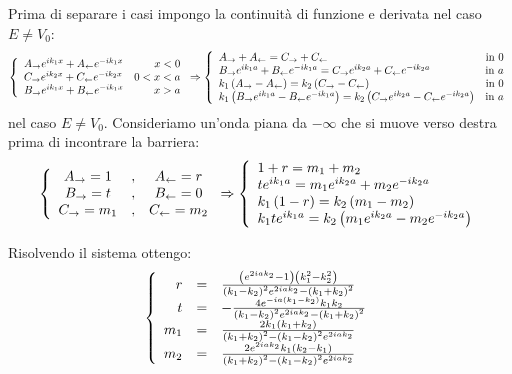 Prima di separare i casi impongo la continuit\`a di funzione e derivata nel caso  $E \neq V_0$:
\begin{equation}\label{eq:continuita}
\lr\{.{\begin{array}{lr}
	A_\to e^{ik_1x} + A_\from e^{-ik_1x}	&	x<0\\
	C_\to e^{ik_2x} + C_\from e^{-ik_2x}	&	0<x<a\\
	B_\to e^{ik_1x} + B_\from e^{-ik_1x}	&	x>a
	\end{array}}\Rightarrow\lr\{.{\begin{array}{lr}
	A_\to  +A_\from = C_\to+C_\from															&	\text{in }0\\
	B_\to e^{ik_1a} +B_\from e^{-ik_1a} = C_\to e^{ik_2a}+C_\from e^{-ik_2a}				&	\text{in }a\\
	k_1\lrt{A_\to-A_\from}=k_2\lrt{C_\to-C_\from }	&	\text{in }0\\
	k_1\lrt{B_\to e^{ik_1a}-B_\from e^{-ik_1a}} = k_2\lrt{C_\to e^{ik_2a}-C_\from e^{-ik_2a}}	&	\text{in }a
	\end{array}}
\end{equation}
nel caso $E \neq V_0$. Consideriamo un'onda piana da $-\infty$ che si muove verso destra prima di incontrare la barriera:
\begin{equation}
\lr\{.{\begin{array}{ccc}
	A_\to = 1&,&
	A_\from = r\\
	B_\to = t&,&
	B_\from=0\\
	C_\to = m_1&,&
	C_\from=m_2
	\end{array}} \Rightarrow\lr\{.{\begin{array}{l}
	1+r= m_1 +m_2 \\
	t e^{ik_1a} = m_1 e^{ik_2a}+m_2 e^{-ik_2a}\\
	k_1\lrt{1 - r}=k_2\lrt{m_1 - m_2}\\
	k_1 t e^{ik_1a} = k_2\lrt{m_1 e^{ik_2a}-m_2 e^{-ik_2a}}
	\end{array}}
\end{equation}

Risolvendo il sistema ottengo:
\begin{equation}
\lr\{.{\begin{array}{rcl}
	r	&=& \frac{\lrt{e^{2 i a k_2}-1}\lrt{k_1^2-k_2^2}}{\lrt{k_1-k_2}^2 e^{2 i a k_2}-\lrt{k_1+k_2}^2}\\
	t	&=& -\frac{4 e^{-i a \lrt{k_1-k_2}} k_1 k_2}{\lrt{k_1-k_2}^2 e^{2 i a k_2}-\lrt{k_1+k_2}^2}\\
	m_1	&=& \frac{2k_1\lrt{k_1+k_2}}{\lrt{k_1+k_2}^2-\lrt{k_1-k_2}^2 e^{2 i a k_2}}\\
	m_2	&=& \frac{2 e^{2 i a k_2}k_1\lrt{k_2-k_1}}{\lrt{k_1+k_2}^2-\lrt{k_1-k_2}^2 e^{2 i a k_2}}
	\end{array}}
\end{equation}

